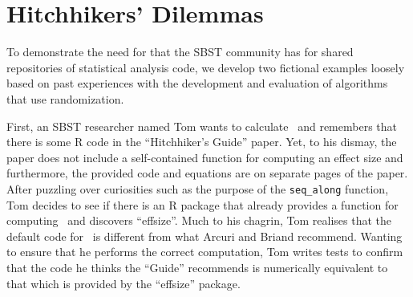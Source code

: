 
\section{Hitchhikers' Dilemmas}
\label{sec:dilemma}

To demonstrate the need for that the SBST community has for shared repositories of statistical analysis code, we develop
two fictional examples loosely based on past experiences with the development and evaluation of algorithms that use
randomization.

First, an SBST researcher named Tom wants to calculate \atwelve~and remembers that there is some R code in the
``Hitchhiker's Guide'' paper. Yet, to his dismay, the paper does not include a self-contained function for computing
an effect size and furthermore, the provided code and equations are on separate pages of the paper. After puzzling over
curiosities such as the purpose of the {\tt seq\_along} function, Tom decides to see if there is an R package that
already provides a function for computing \atwelve~and discovers ``effsize''. Much to his chagrin, Tom realises
that the default code for \atwelve~is different from what Arcuri and Briand recommend. Wanting to ensure that he
performs the correct computation, Tom writes tests to confirm that the code he thinks the ``Guide'' recommends is
numerically equivalent to that which is provided by the ``effsize'' package.


